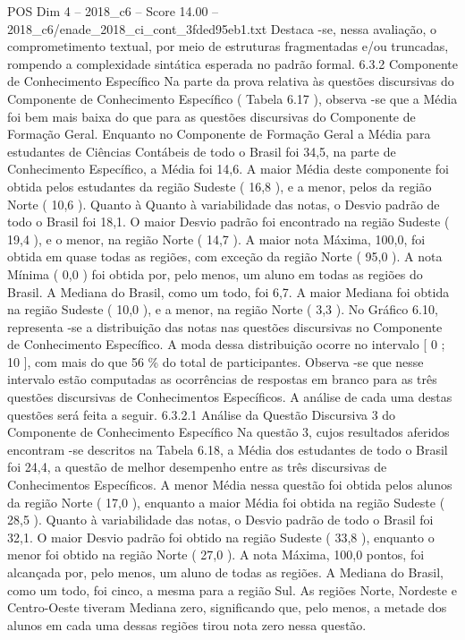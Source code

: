\begin{textsample}{POS Dim 4 – 2018\_c6 – Score 14.00 – 2018\_c6/enade\_2018\_ci\_cont\_3fded95eb1.txt}
Destaca -se, nessa avaliação, o comprometimento textual, por meio de estruturas fragmentadas e/ou truncadas, rompendo a complexidade sintática esperada no padrão formal. 6.3.2 Componente de Conhecimento Específico Na parte da prova relativa às questões discursivas do Componente de Conhecimento Específico ( Tabela 6.17 ), observa -se que a Média foi bem mais baixa do que para as questões discursivas do Componente de Formação Geral.
Enquanto no Componente de Formação Geral a Média para estudantes de Ciências Contábeis de todo o Brasil foi 34,5, na parte de Conhecimento Específico, a Média foi 14,6.
A maior Média deste componente foi obtida pelos estudantes da região Sudeste ( 16,8 ), e a menor, pelos da região Norte ( 10,6 ).
Quanto à Quanto à variabilidade das notas, o Desvio padrão de todo o Brasil foi 18,1.
O maior Desvio padrão foi encontrado na região Sudeste ( 19,4 ), e o menor, na região Norte ( 14,7 ).
A maior nota Máxima, 100,0, foi obtida em quase todas as regiões, com exceção da região Norte ( 95,0 ).
A nota Mínima ( 0,0 ) foi obtida por, pelo menos, um aluno em todas as regiões do Brasil.
A Mediana do Brasil, como um todo, foi 6,7.
A maior Mediana foi obtida na região Sudeste ( 10,0 ), e a menor, na região Norte ( 3,3 ).
No Gráfico 6.10, representa -se a distribuição das notas nas questões discursivas no Componente de Conhecimento Específico.
A moda dessa distribuição ocorre no intervalo [ 0 ; 10 ], com mais do que 56 \% do total de participantes.
Observa -se que nesse intervalo estão computadas as ocorrências de respostas em branco para as três questões discursivas de Conhecimentos Específicos.
A análise de cada uma destas questões será feita a seguir. 6.3.2.1 Análise da Questão Discursiva 3 do Componente de Conhecimento Específico Na questão 3, cujos resultados aferidos encontram -se descritos na Tabela 6.18, a Média dos estudantes de todo o Brasil foi 24,4, a questão de melhor desempenho entre as três discursivas de Conhecimentos Específicos.
A menor Média nessa questão foi obtida pelos alunos da região Norte ( 17,0 ), enquanto a maior Média foi obtida na região Sudeste ( 28,5 ).
Quanto à variabilidade das notas, o Desvio padrão de todo o Brasil foi 32,1.
O maior Desvio padrão foi obtido na região Sudeste ( 33,8 ), enquanto o menor foi obtido na região Norte ( 27,0 ).
A nota Máxima, 100,0 pontos, foi alcançada por, pelo menos, um aluno de todas as regiões.
A Mediana do Brasil, como um todo, foi cinco, a mesma para a região Sul.
As regiões Norte, Nordeste e Centro-Oeste tiveram Mediana zero, significando que, pelo menos, a metade dos alunos em cada uma dessas regiões tirou nota zero nessa questão.

\end{textsample}
